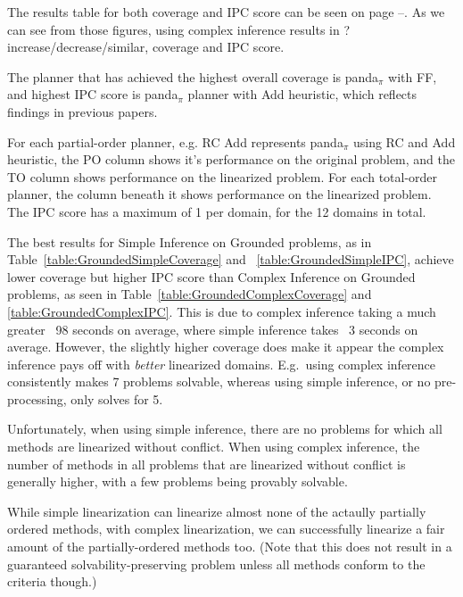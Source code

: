The results table for both coverage and IPC score can be seen on page \pageref{table:GroundedSimpleIPC}--\pageref{table:GroundedComplexIPC}.
As we can see from those figures, using complex inference results in ?  increase/decrease/similar, coverage and IPC score.

The planner that has achieved the highest overall coverage is panda$_\pi$ with FF, and highest IPC score is panda$_\pi$ planner with Add heuristic, which reflects findings in previous papers.

For each partial-order planner, e.g. RC Add represents panda$_\pi$ using RC and Add heuristic,
the PO column shows it's performance on the original problem, and the TO column shows performance on the linearized problem. For each total-order planner, the column beneath it shows performance on the linearized problem.
The IPC score has a maximum of 1 per domain, for the 12 domains in total.

The best results for Simple Inference on Grounded problems, as in Table~\ref{table:GroundedSimpleCoverage} and ~\ref{table:GroundedSimpleIPC},
achieve lower coverage but higher IPC score than Complex Inference on Grounded problems, as seen in Table~\ref{table:GroundedComplexCoverage} and \ref{table:GroundedComplexIPC}. This is due to complex inference taking a much greater ~98 seconds on average, where simple inference takes ~3 seconds on average. However, the slightly higher coverage does make it appear the complex inference pays off with \emph{better} linearized domains. E.g.\ using complex inference consistently makes 7 problems solvable, whereas using simple inference, or no pre-processing, only solves for 5.

Unfortunately, when using simple inference, there are no problems for which all methods are linearized without conflict.
When using complex inference, the number of methods in all problems that are linearized without conflict is generally higher, with a few problems being provably solvable.











While simple linearization can linearize almost none of the actaully partially ordered methods, with complex linearization, we can successfully linearize a fair amount of the partially-ordered methods too. (Note that this does not result in a guaranteed solvability-preserving problem unless all methods conform to the criteria though.)


